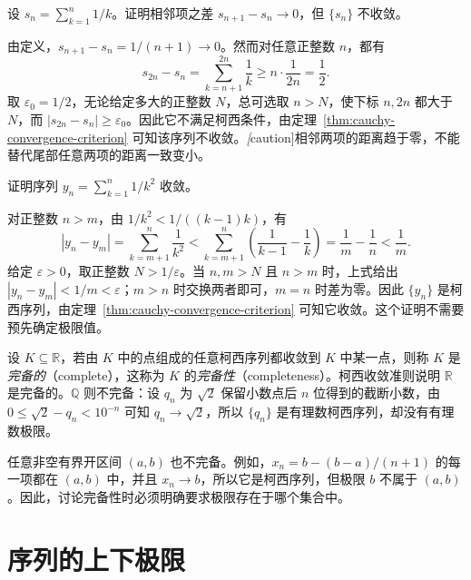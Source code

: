 \documentclass[UTF8,12pt,a4paper,fontset=fandol]{ctexbook}
\begin{document}
\begin{example}
设 $s_n=\sum_{k=1}^{n}1/k$。证明相邻项之差 $s_{n+1}-s_n\to0$，但 $\{s_n\}$ 不收敛。
\end{example}

\begin{solve}
由定义，$s_{n+1}-s_n=1/(n+1)\to0$。然而对任意正整数 $n$，都有
\[
    s_{2n}-s_n=\sum_{k=n+1}^{2n}\frac1k
    \geq n\cdot\frac1{2n}=\frac12.
\]
取 $\varepsilon_0=1/2$，无论给定多大的正整数 $N$，总可选取 $n>N$，使下标 $n,2n$ 都大于 $N$，而 $|s_{2n}-s_n|\geq\varepsilon_0$。因此它不满足柯西条件，由定理~\ref{thm:cauchy-convergence-criterion} 可知该序列不收敛。\emph[caution]{相邻两项的距离趋于零，不能替代尾部任意两项的距离一致变小。}
\end{solve}

\begin{example}
证明序列 $y_n=\sum_{k=1}^{n}1/k^2$ 收敛。
\end{example}

\begin{solve}
对正整数 $n>m$，由 $1/k^2<1/((k-1)k)$，有
\[
    |y_n-y_m|=\sum_{k=m+1}^{n}\frac1{k^2}
    <\sum_{k=m+1}^{n}\left(\frac1{k-1}-\frac1k\right)
    =\frac1m-\frac1n<\frac1m.
\]
给定 $\varepsilon>0$，取正整数 $N>1/\varepsilon$。当 $n,m>N$ 且 $n>m$ 时，上式给出 $|y_n-y_m|<1/m<\varepsilon$；$m>n$ 时交换两者即可，$m=n$ 时差为零。因此 $\{y_n\}$ 是柯西序列，由定理~\ref{thm:cauchy-convergence-criterion} 可知它收敛。这个证明不需要预先确定极限值。
\end{solve}

\begin{remark}
\label{rem:completeness-of-real-numbers}
设 $K\subseteq\mathbb{R}$，若由 $K$ 中的点组成的任意柯西序列都收敛到 $K$ 中某一点，则称 $K$ 是\emph{完备的}（complete），这称为 $K$ 的\emph{完备性}（completeness）。柯西收敛准则说明 $\mathbb{R}$ 是完备的。$\mathbb{Q}$ 则不完备：设 $q_n$ 为 $\sqrt2$ 保留小数点后 $n$ 位得到的截断小数，由 $0\leq\sqrt2-q_n<10^{-n}$ 可知 $q_n\to\sqrt2$，所以 $\{q_n\}$ 是有理数柯西序列，却没有有理数极限。

任意非空有界开区间 $(a,b)$ 也不完备。例如，$x_n=b-(b-a)/(n+1)$ 的每一项都在 $(a,b)$ 中，并且 $x_n\to b$，所以它是柯西序列，但极限 $b$ 不属于 $(a,b)$。因此，讨论完备性时必须明确要求极限存在于哪个集合中。
\end{remark}

\section{序列的上下极限}
\label{sec:upper-and-lower-sequence-limits}
\end{document}
